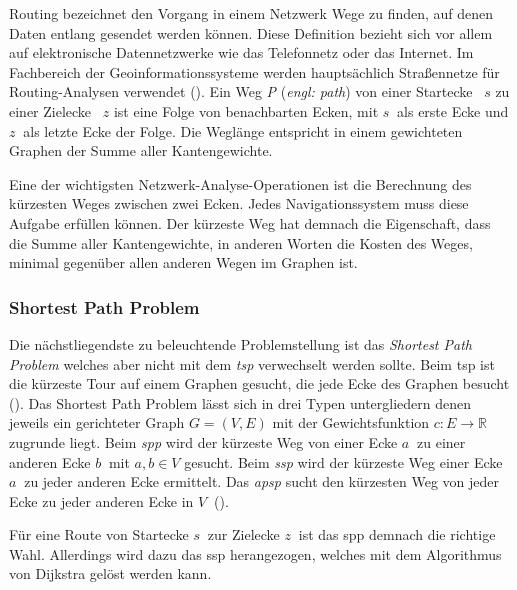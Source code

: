 Routing bezeichnet den Vorgang in einem Netzwerk Wege zu finden, auf denen Daten entlang gesendet werden können.
Diese Definition bezieht sich vor allem auf elektronische Datennetzwerke wie das Telefonnetz oder das Internet.
Im Fachbereich der Geoinformationssysteme werden hauptsächlich Straßennetze für Routing-Analysen verwendet (\cite[165]{handbook}).
Ein Weg \textit{P} (\textit{engl: path}) von einer Startecke ~$s$ zu einer Zielecke ~$z$ ist eine Folge von benachbarten Ecken, mit $s~$ als erste Ecke und $z~$ als letzte Ecke der Folge.
Die Weglänge entspricht in einem gewichteten Graphen der Summe aller Kantengewichte.

Eine der wichtigsten Netzwerk-Analyse-Operationen ist die Berechnung des kürzesten Weges zwischen zwei Ecken.
Jedes Navigationssystem muss diese Aufgabe erfüllen können.
Der kürzeste Weg hat demnach die Eigenschaft, dass die Summe aller Kantengewichte, in anderen Worten die Kosten des Weges, minimal gegenüber allen anderen Wegen im Graphen ist.

\subsubsection{Shortest Path Problem}
Die nächstliegendste zu beleuchtende Problemstellung ist das \textit{Shortest Path Problem} welches aber nicht mit dem \textit{\gls{tsp}} verwechselt werden sollte.
Beim \gls{tsp} ist die kürzeste Tour auf einem Graphen gesucht, die jede Ecke des Graphen besucht (\cite[135]{algorithms}).
Das Shortest Path Problem lässt sich in drei Typen untergliedern denen jeweils ein gerichteter Graph $G = (V,E)$ mit der Gewichtsfunktion $c: E \rightarrow \mathbb{R}$ zugrunde liegt.
Beim \textit{\gls{spp}} wird der kürzeste Weg von einer Ecke $a~$ zu einer anderen Ecke $b~$ mit $a,b\in V$ gesucht.
Beim \textit{\gls{ssp}} wird der kürzeste Weg einer Ecke $a~$ zu jeder anderen Ecke ermittelt.
Das \textit{\gls{apsp}} sucht den kürzesten Weg von jeder Ecke zu jeder anderen Ecke in $V~$ (\cite[169\psq]{algorithms}).

Für eine Route von Startecke $s~$ zur Zielecke $z~$ ist das \gls{spp} demnach die richtige Wahl.
Allerdings wird dazu das \gls{ssp} herangezogen, welches mit dem Algorithmus von Dijkstra gelöst werden kann.


